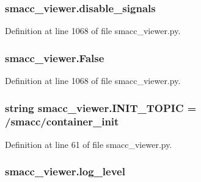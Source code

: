 \subsubsection[{\texorpdfstring{disable\+\_\+signals}{disable_signals}}]{\setlength{\rightskip}{0pt plus 5cm}smacc\+\_\+viewer.\+disable\+\_\+signals}\hypertarget{namespacesmacc__viewer_aa88a86e162b0d7e1d6cc5129943518fa}{}\label{namespacesmacc__viewer_aa88a86e162b0d7e1d6cc5129943518fa}


Definition at line 1068 of file smacc\+\_\+viewer.\+py.

\subsubsection[{\texorpdfstring{False}{False}}]{\setlength{\rightskip}{0pt plus 5cm}smacc\+\_\+viewer.\+False}\hypertarget{namespacesmacc__viewer_a5928e8da279785cbab9011356c3eaa87}{}\label{namespacesmacc__viewer_a5928e8da279785cbab9011356c3eaa87}


Definition at line 1068 of file smacc\+\_\+viewer.\+py.

\subsubsection[{\texorpdfstring{I\+N\+I\+T\+\_\+\+T\+O\+P\+IC}{INIT_TOPIC}}]{\setlength{\rightskip}{0pt plus 5cm}string smacc\+\_\+viewer.\+I\+N\+I\+T\+\_\+\+T\+O\+P\+IC = \textquotesingle{}/smacc/container\+\_\+init\textquotesingle{}}\hypertarget{namespacesmacc__viewer_a894088dc156a7eb1425c7491c241e85e}{}\label{namespacesmacc__viewer_a894088dc156a7eb1425c7491c241e85e}


Definition at line 61 of file smacc\+\_\+viewer.\+py.

\subsubsection[{\texorpdfstring{log\+\_\+level}{log_level}}]{\setlength{\rightskip}{0pt plus 5cm}smacc\+\_\+viewer.\+log\+\_\+level}\hypertarget{namespacesmacc__viewer_a997673f28e395149d6c3c5fcd77824c4}{}\label{namespacesmacc__viewer_a997673f28e395149d6c3c5fcd77824c4}



